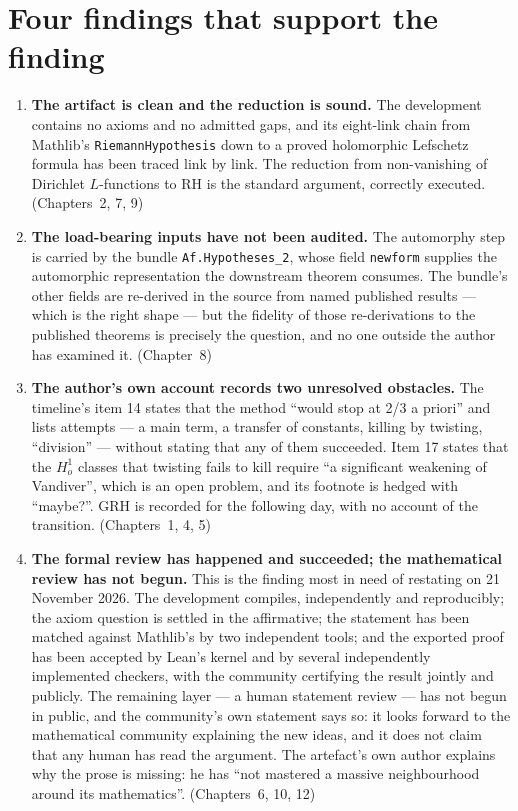 \section{Four findings that support the finding}\begin{enumerate}
\item \textbf{The artifact is clean and the reduction is sound.} The
development contains no axioms and no admitted gaps, and its eight-link chain
from Mathlib's \texttt{RiemannHypothesis} down to a proved holomorphic
Lefschetz formula has been traced link by link. The reduction from
non-vanishing of Dirichlet $L$-functions to RH is the standard argument,
correctly executed. \hfill(Chapters~2, 7, 9)

\item \textbf{The load-bearing inputs have not been audited.} The
automorphy step is carried by the bundle \texttt{Af.Hypotheses\_2}, whose
field \texttt{newform} supplies the automorphic representation the downstream
theorem consumes. The bundle's other fields are re-derived in the source from
named published results --- which is the right shape --- but the fidelity of
those re-derivations to the published theorems is precisely the question, and
no one outside the author has examined it. \hfill(Chapter~8)

\item \textbf{The author's own account records two unresolved obstacles.} The
timeline's item 14 states that the method ``would stop at 2/3 a priori'' and
lists attempts --- a main term, a transfer of constants, killing by twisting,
``division'' --- without stating that any of them succeeded. Item 17 states
that the $H^1_o$ classes that twisting fails to kill require ``a significant
weakening of Vandiver'', which is an open problem, and its footnote is
hedged with ``maybe?''. GRH is recorded for the following day, with no
account of the transition. \hfill(Chapters~1, 4, 5)

\item \textbf{The formal review has happened and succeeded; the mathematical
review has not begun.} This is the finding most in need of restating on 21
November 2026. The development compiles, independently and reproducibly; the
axiom question is settled in the affirmative; the statement has been matched
against Mathlib's by two independent tools; and the exported proof has been
accepted by Lean's kernel and by several independently implemented checkers,
with the community certifying the result jointly and publicly. The remaining
layer --- a human statement review --- has not begun in public, and the
community's own statement says so: it looks forward to the mathematical
community explaining the new ideas, and it does not claim that any human has
read the argument. The artefact's own author explains why the prose is
missing: he has ``not mastered a massive neighbourhood around its
mathematics''. \hfill(Chapters~6, 10, 12)
\end{enumerate}

